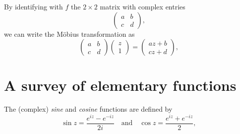 By identifying with \(f\) the \(2 \times 2\) matrix with complex entries
\[
    \begin{pmatrix}
        a & b\\
        c & d
    \end{pmatrix},
\]
we can write the Möbius transformation as
\[
    \begin{pmatrix}
        a & b\\
        c & d
    \end{pmatrix}
    \begin{pmatrix}
        z\\
        1
    \end{pmatrix}
    =
    \begin{pmatrix}
        az + b\\
        cz + d
    \end{pmatrix},
\]

\section{A survey of elementary functions}

\begin{definition}
    The (complex) \emph{sine} and \emph{cosine} functions are defined by
    \[
        \sin z = \frac{e^{iz} - e^{-iz}}{2i} \quad \text{and} \quad \cos z = \frac{e^{iz} + e^{-iz}}{2},
    \]
\end{definition}